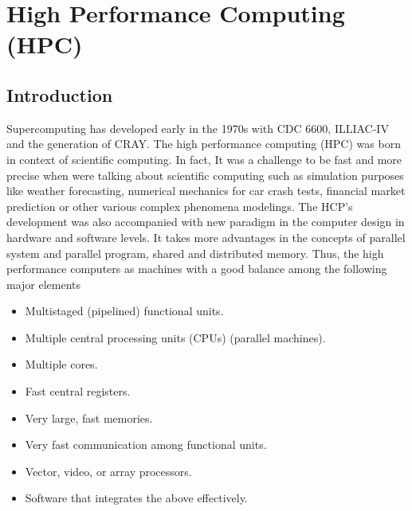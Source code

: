 \chapter{High Performance Computing (HPC)} \label{HPC1}
\section{Introduction}
Supercomputing has developed early in the 1970s with CDC 6600, ILLIAC-IV and the generation of CRAY. The high performance computing (HPC) was born in context of scientific computing. In fact, It was a challenge to be fast and more precise when were talking about scientific computing such as simulation purposes like weather forecasting, numerical mechanics for car crash tests, financial market prediction or other various complex phenomena modelings. The HCP's development was also accompanied with new paradigm in the computer design in hardware and software levels. It takes more advantages in the concepts of parallel system and parallel program, shared and distributed memory. Thus, the high performance computers as
machines with a good balance among the following major elements \cite{Rubin}
\begin{itemize}
\item Multistaged (pipelined) functional units.
\item Multiple central processing units (CPUs) (parallel machines).
\item Multiple cores. 
\item Fast central registers.
\item Very large, fast memories.
\item Very fast communication among functional units.
\item Vector, video, or array processors.
\item Software that integrates the above effectively.
\end{itemize}

